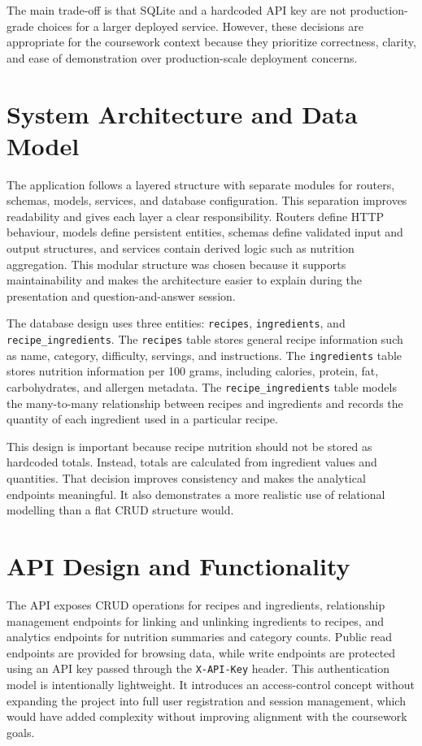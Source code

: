 \documentclass[11pt,a4paper]{article}
\begin{document}
The main trade-off is that SQLite and a hardcoded API key are not production-grade choices for a larger deployed service. However, these decisions are appropriate for the coursework context because they prioritize correctness, clarity, and ease of demonstration over production-scale deployment concerns.

\section{System Architecture and Data Model}
The application follows a layered structure with separate modules for routers, schemas, models, services, and database configuration. This separation improves readability and gives each layer a clear responsibility. Routers define HTTP behaviour, models define persistent entities, schemas define validated input and output structures, and services contain derived logic such as nutrition aggregation. This modular structure was chosen because it supports maintainability and makes the architecture easier to explain during the presentation and question-and-answer session.



The database design uses three entities: \texttt{recipes}, \texttt{ingredients}, and \texttt{recipe\_ingredients}. The \texttt{recipes} table stores general recipe information such as name, category, difficulty, servings, and instructions. The \texttt{ingredients} table stores nutrition information per 100 grams, including calories, protein, fat, carbohydrates, and allergen metadata. The \texttt{recipe\_ingredients} table models the many-to-many relationship between recipes and ingredients and records the quantity of each ingredient used in a particular recipe.



This design is important because recipe nutrition should not be stored as hardcoded totals. Instead, totals are calculated from ingredient values and quantities. That decision improves consistency and makes the analytical endpoints meaningful. It also demonstrates a more realistic use of relational modelling than a flat CRUD structure would.

\section{API Design and Functionality}
The API exposes CRUD operations for recipes and ingredients, relationship management endpoints for linking and unlinking ingredients to recipes, and analytics endpoints for nutrition summaries and category counts. Public read endpoints are provided for browsing data, while write endpoints are protected using an API key passed through the \texttt{X-API-Key} header. This authentication model is intentionally lightweight. It introduces an access-control concept without expanding the project into full user registration and session management, which would have added complexity without improving alignment with the coursework goals.
\end{document}
